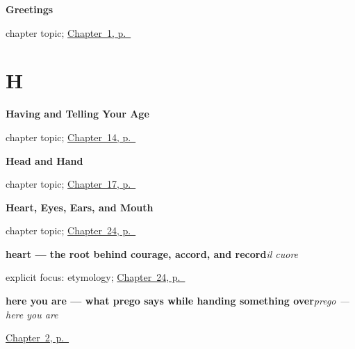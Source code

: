 \noindent\begin{minipage}[t]{\linewidth}
\raggedright
\textbf{Greetings}\par
\footnotesize chapter topic; \hyperref[ch:greetings]{Chapter~1, p.~\pageref*{ch:greetings}}
\end{minipage}\par\smallskip

\section*{H}

\noindent\begin{minipage}[t]{\linewidth}
\raggedright
\textbf{Having and Telling Your Age}\par
\footnotesize chapter topic; \hyperref[ch:it-having-and-age]{Chapter~14, p.~\pageref*{ch:it-having-and-age}}
\end{minipage}\par\smallskip

\noindent\begin{minipage}[t]{\linewidth}
\raggedright
\textbf{Head and Hand}\par
\footnotesize chapter topic; \hyperref[ch:it-head-and-hand]{Chapter~17, p.~\pageref*{ch:it-head-and-hand}}
\end{minipage}\par\smallskip

\noindent\begin{minipage}[t]{\linewidth}
\raggedright
\textbf{Heart, Eyes, Ears, and Mouth}\par
\footnotesize chapter topic; \hyperref[ch:it-heart-eyes-ears-mouth]{Chapter~24, p.~\pageref*{ch:it-heart-eyes-ears-mouth}}
\end{minipage}\par\smallskip

\noindent\begin{minipage}[t]{\linewidth}
\raggedright
\textbf{heart — the root behind courage, accord, and record}\enspace\emph{il cuore}\par
\footnotesize explicit focus: etymology; \hyperref[ch:it-heart-eyes-ears-mouth]{Chapter~24, p.~\pageref*{ch:it-heart-eyes-ears-mouth}}
\end{minipage}\par\smallskip

\noindent\begin{minipage}[t]{\linewidth}
\raggedright
\textbf{here you are — what prego says while handing something over}\enspace\emph{prego — here you are}\par
\footnotesize \hyperref[ch:it-how-are-you]{Chapter~2, p.~\pageref*{ch:it-how-are-you}}
\end{minipage}\par\smallskip

